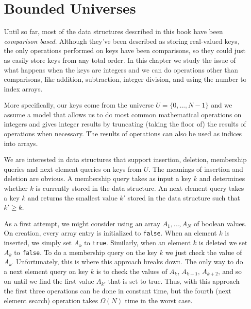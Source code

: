 \chapter{Bounded Universes}


Until so far, most of the data structures described in this book have
been \emph{comparison based}.  Although they've been described as
storing real-valued keys, the only operations performed on keys have
been comparisons, so they could just as easily store keys from any
total order.  In this chapter we study the issue of what happens when
the keys are integers and we can do operations other than comparisons,
like addition, subtraction, integer division, and using the number to
index arrays.

More specifically, our keys come from the universe $U=\{0,\ldots,N-1\}$
and we assume a model that allows us to do most common mathematical
operations on integers and gives integer results by truncating (taking
the floor of) the results of operations when necessary.  The results
of operations can also be used as indices into arrays.

We are interested in data structures that support insertion, deletion,
membership queries and next element queries on keys from $U$.  The
meanings of insertion and deletion are obvious.  A membership query
takes as input a key $k$ and determines whether $k$ is currently
stored in the data structure.  An next element query takes a key $k$
and returns the smallest value $k'$ stored in the data structure such
that $k'\ge k$.

As a first attempt, we might consider using an array $A_1,\ldots,A_N$
of boolean values.  On creation, every array entry is initialized to
\texttt{false}.  When an element $k$ is inserted, we simply set $A_k$
to \texttt{true}.  Similarly, when an element $k$ is deleted we set
$A_k$ to \texttt{false}.  To do a membership query on the key $k$ we
just check the value of $A_k$.  Unfortunately, this is where this
approach breaks down.  The only way to do a next element query on key
$k$ is to check the values of $A_k$, $A_{k+1}$, $A_{k+2}$, and so on
until we find the first value $A_{k'}$ that is set to true.  Thus,
with this approach the first three operations can be done in constant
time, but the fourth (next element search) operation takes $\Omega(N)$ time
in the worst case.


